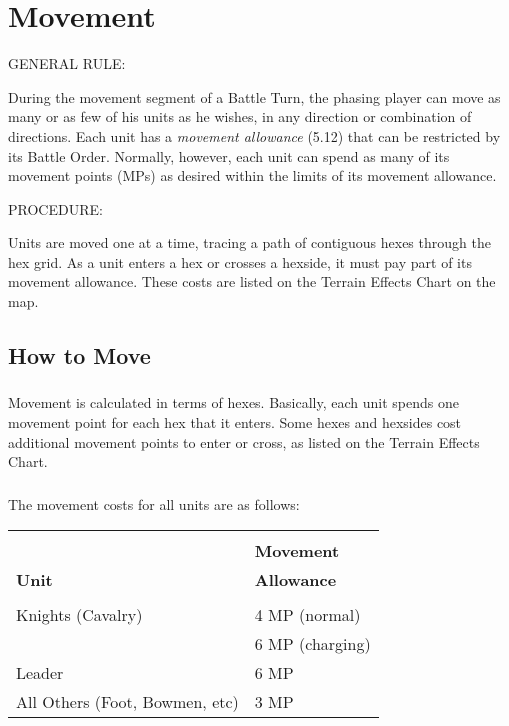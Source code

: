 \section{Movement}

GENERAL RULE:

During the movement segment of a Battle Turn, the phasing player can move as many or as few of his units as he wishes, in any direction or combination of directions. Each unit has a \textit{movement allowance} (5.12) that can be restricted by its Battle Order. Normally, however, each unit can spend as many of its movement points (MPs) as desired within the limits of its movement allowance.

PROCEDURE:

Units are moved one at a time, tracing a path of contiguous hexes through the hex grid. As a unit enters a hex or crosses a hexside, it must pay part of its movement allowance. These costs are listed on the Terrain Effects Chart on the map.

\subsection{How to Move}

\subsubsection[Movement Calculation]{} Movement is calculated in terms of hexes. Basically, each unit spends one movement point for each hex that it enters. Some hexes and hexsides cost additional movement points to enter or cross, as listed on the Terrain Effects Chart.

\subsubsection[Movement Costs]{} The movement costs for all units are as follows:

\begin{tabular}{ |l|l| }
  \hline \\ [-2.0ex]
  & \textbf{Movement} \\
  \textbf{Unit} & \textbf{Allowance} \\
  \hline \\ [-2.0ex]
  Knights (Cavalry) & 4 MP (normal) \\
  & 6 MP (charging) \\
  Leader & 6 MP \\
  All Others (Foot, Bowmen, etc) & 3 MP \\
  \hline
\end{tabular}

